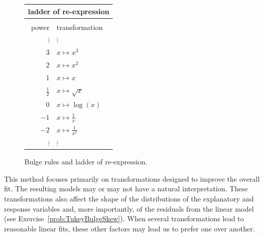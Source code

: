 \documentclass[twoside]{book}\usepackage[]{graphicx}\usepackage[]{xcolor}
\begin{document}
\begin{figure}
\begin{center}
\hfill
\begin{minipage}{0.35\textwidth}
\vspace*{-1.5in}
\begin{tabular}{rl}
\multicolumn{2}{c}{\textbf{ladder of re-expression}}
\\
\hline
\\[-1mm]
{power} & {transformation}\\
$\vdots$ & $\vdots$ \\
$3$ & $x \mapsto x^3$ \\[1mm]
$2$ & $x \mapsto x^2$ \\[1mm]
$1$ & $x \mapsto x$ \\[1mm]
$\frac12$ & $x \mapsto \sqrt{x}$ \\[1mm]
$0$ & $x \mapsto \log(x)$ \\[1mm]
$-1$ & $x \mapsto \frac1x$ \\[1mm]
$-2$ & $x \mapsto \frac{1}{x^2}$ \\[1mm]
$\vdots$ & $\vdots$ \\
\end{tabular}
\end{minipage}
\end{center}
\caption{Bulge rules and ladder of re-expression.}
\label{fig:TukeyBulge}%
\end{figure}
%

This method focuses primarily on transformations designed to improve
the overall fit.  The resulting models may or may not have 
a natural interpretation.  These transformations also affect the 
shape of the distributions of the explanatory and response variables
and, more importantly, of the residuals from the linear model  
(see Exercise~\ref{prob:TukeyBulgeSkew}).
When several transformations lead to reasonable linear fits, these other
factors may lead us to prefer one over another.
\end{document}
